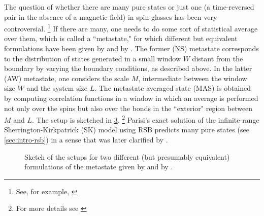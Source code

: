 The question of whether there are many pure states or just one (a time-reversed
pair in the absence of a magnetic field) in spin glasses has been very
controversial.%
\footnote{%
  See, for example,
  \textcite{%
    parisi1980order,%
    parisi1983order,%
    fisher1987absence,%
    fisher1988equilibrium,%
    moore2011disappearance%
  }
}
If there are many, one needs to do some sort of statistical average over them,
which is called a ``metastate," for which different but equivalent formulations
have been given by \textcite{newman1997metastate} and by
\textcite{aizenman1990rounding}. The former (NS) metastate corresponds to the
distribution of states generated in a small window $W$ distant from the
boundary by varying the boundary conditions, as described above. In the latter
(AW) metastate, one considers the scale $M$, intermediate between the window
size $W$ and the system size $L$. The metastate-averaged state (MAS) is
obtained by computing correlation functions in a window in which an average is
performed not only over the spins but also over the bonds in the ``exterior"
region between $M$ and $L$. The setup is sketched in \cref{fig:metastates}.%
\footnote{%
  For more details see
  \textcite{%
    aizenman1990rounding,%
    read2014short,%
    manssen2015aging%
  }
}
Parisi's exact solution of the infinite-range Sherrington-Kirkpatrick (SK)
model using RSB predicts many pure states (see \cref{sec:intro-rsb}) in a sense
that was later clarified by \textcite{newman1997metastate}.

\begin{figure}
  \centering
  \begin{subfigure}{0.49\textwidth}
    \centering
    
    \label{fig:ns-metastate}
  \end{subfigure}
  \begin{subfigure}{0.49\textwidth}
    \centering
    
    \label{fig:aw-metastate}
  \end{subfigure}
  \caption[
    The spin-glass metastate as defined by \textcite{newman1997metastate} and
    by \textcite{aizenman1990rounding}.
  ]
  {
    Sketch of the setups for two different (but presumably equivalent)
    formulations of the metastate given by 
    \textcite{newman1997metastate} and by 
    \textcite{aizenman1990rounding}.
  } \label{fig:metastates}
\end{figure}

